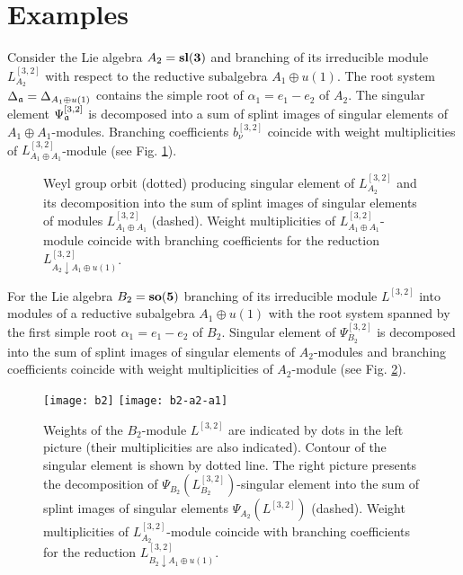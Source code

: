 \section{Examples}
\label{sec:examples}
\begin{example}
  Consider the Lie algebra $A_{2} =\bf{sl}(3)$ and branching of its irreducible module $L^{[3,2]}_{A_{2}}$ with respect to the reductive subalgebra $A_{1}\oplus u(1)$. The root system  $\Delta _{\mathfrak{a}}= \Delta_{A_{1}\oplus u(1)}$ contains the simple root of $\alpha_1=e_1-e_2$ of $A_{2}$. The singular element $\Psi^{[3,2]}_{\mathfrak{a}}$ is decomposed into a sum of splint images of singular elements of $A_{1}\oplus A_{1}$-modules. Branching coefficients $b_{\nu }^{[ 3,2 ] }$ coincide with weight multiplicities of $L^{[3,2]}_{A_{1}\oplus A_{1}}$-module (see Fig. \ref{fig:a2_splint}).

  \begin{figure}[h!bt]
  \noindent\centering{
   \texttt{[image: a2-a1]}
  }
  \caption{Weyl group orbit (dotted) producing singular element of $L^{[3,2]}_{A_{2}}$ and its decomposition into the sum of splint images of singular elements of modules  $L^{[3,2]}_{A_{1}\oplus A_{1}}$ (dashed). Weight multiplicities of $L^{[3,2]}_{A_{1}\oplus A_{1}}$-module coincide with branching coefficients for the reduction $L^{[3,2]}_{A_{2}\downarrow A_{1}\oplus u(1)}$.}

 \label{fig:a2_splint}
\end{figure}
\end{example}
\begin{example}
  For the Lie algebra $B_{2}= \bf{so}(5)$ branching of its irreducible module $L^{[3,2]}$ into  modules of a reductive subalgebra $A_{1}\oplus u(1)$ with the root system spanned by the first simple root $\alpha_1=e_1-e_2$ of $B_{2}$. Singular element of $\Psi^{[3,2]}_{B_{2}}$ is decomposed into the sum of splint images of singular elements of $A_{2}$-modules and branching coefficients coincide with weight multiplicities of $A_{2}$-module (see Fig. \ref{fig:b2_splint}).

  \begin{figure}[h!bt]
  \hspace*{-1.2cm}

   \texttt{[image: b2]}
   \texttt{[image: b2-a2-a1]}
  \caption{Weights of the $B_{2}$-module $L^{[3,2]}$ are indicated by dots in the left picture (their multiplicities are also indicated). Contour of the singular element is shown by dotted line. The right picture presents the decomposition of  $\Psi_{B_{2}}(L^{[3,2]}_{B_{2}})$-singular element into the sum of splint images of singular elements $\Psi_{A_{2}}(L^{[3,2]})$ (dashed). Weight multiplicities of $L^{[3,2]}_{A_{2}}$-module coincide with branching coefficients for the reduction $L^{[3,2]}_{B_{2}\downarrow A_{1}\oplus u(1)}$.}

 \label{fig:b2_splint}
\end{figure}
\end{example}

